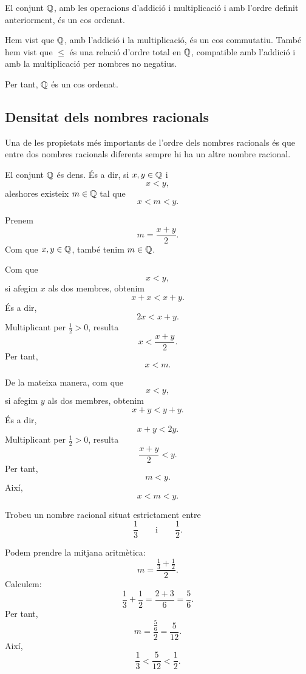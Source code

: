 \begin{proposicio}
El conjunt \(\mathbb{Q}\), amb les operacions d'addició i multiplicació i amb l'ordre definit anteriorment, és un cos ordenat.
\end{proposicio}

\begin{prova}
Hem vist que \(\mathbb{Q}\), amb l'addició i la multiplicació, és un cos commutatiu. També hem vist que \(\leq\) és una relació d'ordre total en \(\mathbb{Q}\), compatible amb l'addició i amb la multiplicació per nombres no negatius.

Per tant, \(\mathbb{Q}\) és un cos ordenat.
\end{prova}

\subsection{Densitat dels nombres racionals}

Una de les propietats més importants de l'ordre dels nombres racionals és que entre dos nombres racionals diferents sempre hi ha un altre nombre racional.

\begin{proposicio}
El conjunt \(\mathbb{Q}\) és dens. És a dir, si \(x,y\in\mathbb{Q}\) i
\[
	x<y,
\]
aleshores existeix \(m\in\mathbb{Q}\) tal que
\[
	x<m<y.
\]
\end{proposicio}

\begin{prova}
Prenem
\[
	m=\frac{x+y}{2}.
\]
Com que \(x,y\in\mathbb{Q}\), també tenim \(m\in\mathbb{Q}\).

Com que
\[
	x<y,
\]
si afegim \(x\) als dos membres, obtenim
\[
	x+x<x+y.
\]
És a dir,
\[
	2x<x+y.
\]
Multiplicant per \(\frac{1}{2}>0\), resulta
\[
	x<\frac{x+y}{2}.
\]
Per tant,
\[
	x<m.
\]

De la mateixa manera, com que
\[
	x<y,
\]
si afegim \(y\) als dos membres, obtenim
\[
	x+y<y+y.
\]
És a dir,
\[
	x+y<2y.
\]
Multiplicant per \(\frac{1}{2}>0\), resulta
\[
	\frac{x+y}{2}<y.
\]
Per tant,
\[
	m<y.
\]
Així,
\[
	x<m<y.
\]
\end{prova}

\begin{exemple}
Trobeu un nombre racional situat estrictament entre
\[
	\frac{1}{3}
	\qquad\text{i}\qquad
	\frac{1}{2}.
\]
\end{exemple}

\begin{solucio}
Podem prendre la mitjana aritmètica:
\[
	m=
	\frac{\frac{1}{3}+\frac{1}{2}}{2}.
\]
Calculem:
\[
	\frac{1}{3}+\frac{1}{2}
	=
	\frac{2+3}{6}
	=
	\frac{5}{6}.
\]
Per tant,
\[
	m=
	\frac{\frac{5}{6}}{2}
	=
	\frac{5}{12}.
\]
Així,
\[
	\frac{1}{3}<\frac{5}{12}<\frac{1}{2}.
\]
\end{solucio}

